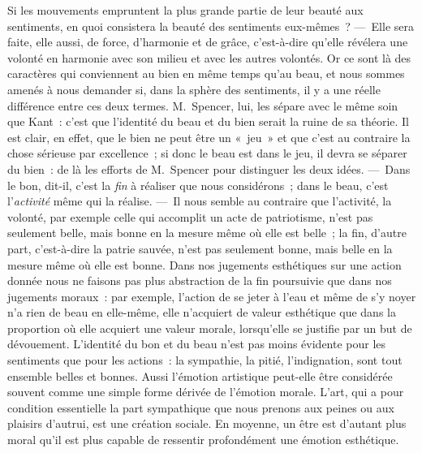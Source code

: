 \documentclass[french,twoside]{book} %
\begin{document}
Si les mouvements empruntent la plus grande partie de leur beauté aux sentiments, en quoi consistera la beauté des sentiments eux-mêmes ? — Elle sera faite, elle aussi, de force, d’harmonie et de grâce, c’est-à-dire qu’elle révélera une volonté en harmonie avec son milieu et avec les autres volontés. Or ce sont là des caractères qui conviennent au bien en même temps qu’au beau, et nous sommes amenés à nous demander si, dans la sphère des sentiments, il y a une réelle différence entre ces deux termes. M. Spencer, lui, les sépare avec le même soin que Kant : c’est que l’identité du beau et du bien serait la ruine de sa théorie. Il est clair, en effet, que le bien ne peut être un « jeu » et que c’est au contraire la chose sérieuse par excellence ; si donc le beau est dans le jeu, il devra se séparer du bien : de là les efforts de M. Spencer pour distinguer les deux idées. — Dans le bon, dit-il, c’est la \emph{fin} à réaliser que nous considérons ; dans le beau, c’est l’\emph{activité} même qui la réalise. — Il nous semble au contraire que l’activité, la volonté,  par exemple celle qui accomplit un acte de patriotisme, n’est pas seulement belle, mais bonne en la mesure même où elle est belle ; la fin, d’autre part, c’est-à-dire la patrie sauvée, n’est pas seulement bonne, mais belle en la mesure même où elle est bonne. Dans nos jugements esthétiques sur une action donnée nous ne faisons pas plus abstraction de la fin poursuivie que dans nos jugements moraux : par exemple, l’action de se jeter à l’eau et même de s’y noyer n’a rien de beau en elle-même, elle n’acquiert de valeur esthétique que dans la proportion où elle acquiert une valeur morale, lorsqu’elle se justifie par un but de dévouement. L’identité du bon et du beau n’est pas moins évidente pour les sentiments que pour les actions : la sympathie, la pitié, l’indignation, sont tout ensemble belles et bonnes. Aussi l’émotion artistique peut-elle être considérée souvent comme une simple forme dérivée de l’émotion morale. L’art, qui a pour condition essentielle la part sympathique que nous prenons aux peines ou aux plaisirs d’autrui, est une création sociale. En moyenne, un être est d’autant plus moral qu’il est plus capable de ressentir profondément une émotion esthétique.\par
\end{document}
